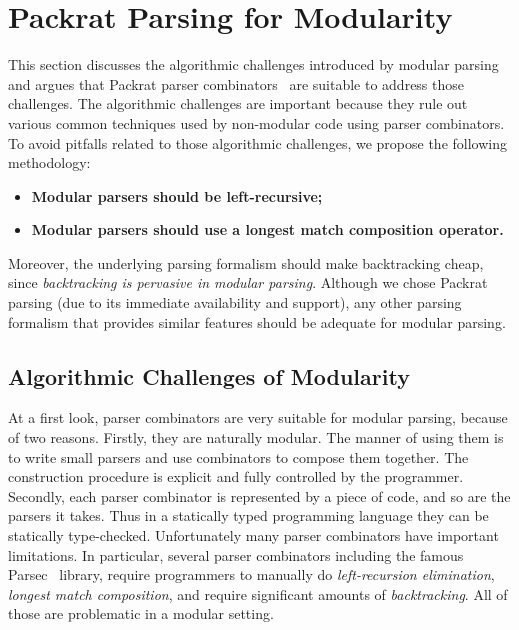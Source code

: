\section{Packrat Parsing for Modularity}\label{sec:packrat}

This section discusses the algorithmic challenges introduced by
modular parsing and argues that Packrat parser combinators~\cite{Ford2002}
are suitable to address those challenges. The algorithmic challenges
are important because they rule out various common techniques
used by non-modular code using parser combinators.
To avoid pitfalls related to those algorithmic challenges,
we propose the following methodology:

\begin{itemize}

\item \textbf{Modular parsers should be left-recursive;}

\item \textbf{Modular parsers should use a longest match composition operator.}

\end{itemize}

Moreover, the underlying parsing formalism should make backtracking
cheap, since \emph{backtracking is pervasive in modular parsing}.
Although we chose Packrat parsing (due to its immediate availability
and support), any other parsing formalism that provides similar
features should be adequate for modular parsing.

\subsection{Algorithmic Challenges of Modularity}\label{subsec:challenges}
At a first look, parser combinators are very suitable for modular parsing, because of two reasons. Firstly, they are naturally modular. The manner of using them is to write small parsers and use combinators to compose them together. The construction procedure is explicit and fully controlled by the programmer. Secondly, each parser combinator is represented by a piece of code, and so are the parsers it takes. Thus in a statically typed programming language they can be statically type-checked.
Unfortunately many parser combinators have important limitations.
In particular, several parser combinators including the famous Parsec~\cite{Leijen2001} library, require
programmers to manually do \textit{left-recursion elimination}, \textit{longest match composition}, and
require significant amounts of \textit{backtracking}. All of those are
problematic in a modular setting.


